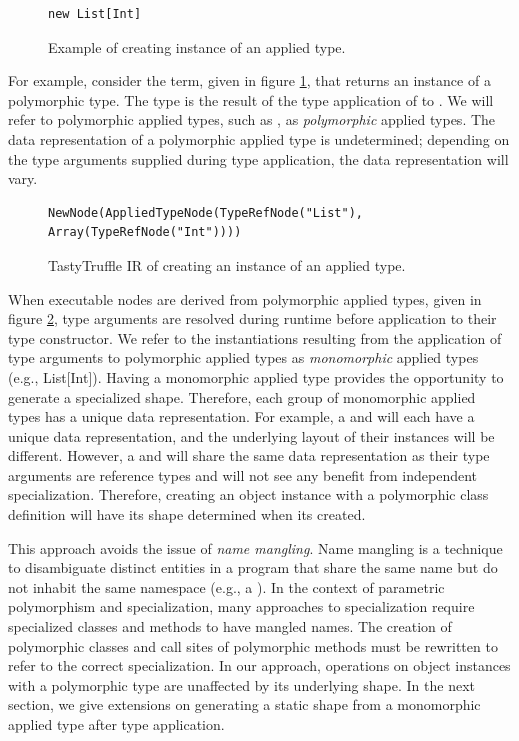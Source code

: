 \begin{figure}[!htb]
\begin{verbatim}
new List[Int]
\end{verbatim}
\caption{Example of creating instance of an applied type.}
\label{example:applied-type}
\end{figure}

For example, consider the term, given in figure \ref{example:applied-type}, that returns an instance of a polymorphic type.
The type  is the result of the type application of  to .
We will refer to polymorphic applied types, such as , as \textit{polymorphic} applied types. 
The data representation of a polymorphic applied type is undetermined; depending on the type arguments supplied during type application, the data representation will vary.

\begin{figure}[!htb]
\begin{verbatim}
NewNode(AppliedTypeNode(TypeRefNode("List"), Array(TypeRefNode("Int"))))
\end{verbatim}
\caption{TastyTruffle IR of creating an instance of an applied type.}
\label{example:applied-type-node}
\end{figure}

When executable nodes are derived from polymorphic applied types, given in figure \ref{example:applied-type-node}, type arguments are resolved during runtime before application to their type constructor.
We refer to the instantiations resulting from the application of type arguments to polymorphic applied types as \textit{monomorphic} applied types (e.g., List[Int]).
Having a monomorphic applied type provides the opportunity to generate a specialized shape.
Therefore, each group of monomorphic applied types has a unique data representation.
For example, a  and  will each have a unique data representation, and the underlying layout of their instances will be different.
However, a  and  will share the same data representation as their type arguments are reference types and will not see any benefit from independent specialization.
Therefore, creating an object instance with a polymorphic class definition will have its shape determined when its created.

This approach avoids the issue of \textit{name mangling}.
Name mangling is a technique to disambiguate distinct entities in a program that share the same name but do not inhabit the same namespace (e.g., a ).
In the context of parametric polymorphism and specialization, many approaches to specialization require specialized classes and methods to have mangled names.
The creation of polymorphic classes and call sites of polymorphic methods must be rewritten to refer to the correct specialization.
In our approach, operations on object instances with a polymorphic type are unaffected by its underlying shape.
In the next section, we give extensions on generating a static shape from a monomorphic applied type after type application.

